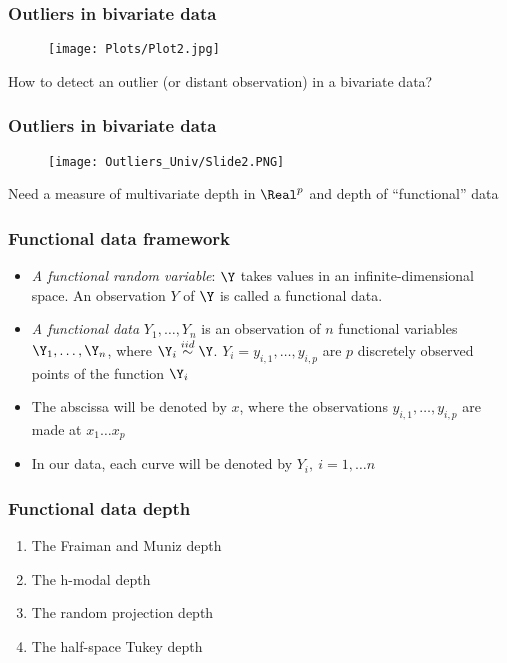 \documentclass[10pt,dvipsnames,table]{beamer}
\begin{document}
\begin{frame}
\frametitle{Outliers in bivariate data}
\vspace{-0.5cm}
\begin{figure}[t]
\centering
\texttt{[image: Plots/Plot2.jpg]}
\end{figure}
\vspace{-0.5cm}
How to detect an outlier (or distant observation) in a bivariate data?
\end{frame}

\begin{frame}
\frametitle{Outliers in bivariate data}
\vspace{-0.5cm}
\begin{figure}[t]
\centering
\texttt{[image: Outliers\_Univ/Slide2.PNG]}
\end{figure}
\vspace{-0.5cm}
Need a measure of multivariate depth in $\Real ^ p$ and depth of ``functional'' data
\end{frame}

\begin{frame}
\frametitle{Functional data framework}
\begin{itemize}
\item {\emph{A functional random variable}}: $\Y$ takes values in an infinite-dimensional space. An observation $Y$ of $\Y$ is called a functional data.
\item {\emph{A functional data}} $Y_1, \dots, Y_n$ is an observation of $n$ functional variables $\Y_1, \dots, \Y_n$, where $\Y_i \stackrel{iid}{\sim} \Y$. $Y_i = {y_{i,1}, \dots, y_{i,p}}$ are $p$ discretely observed points of the function $\Y_i$
\item The abscissa will be denoted by $x$, where the observations $y_{i,1}, \dots, y_{i,p}$ are made at $x_1 \dots x_p$
\item In our data, each curve will be denoted by $Y_i, \ i = 1, \dots n$
\end{itemize}
\end{frame}

\begin{frame}
\frametitle{Functional data depth}
\LARGE
\begin{enumerate}
\item The Fraiman and Muniz depth
\vspace{0.25in}
\item The h-modal depth
\vspace{0.25in}
\item The random projection depth
\vspace{0.25in}
\item The half-space Tukey depth
\end{enumerate}
\end{frame}
\end{document}
